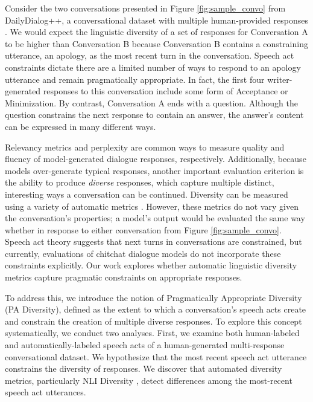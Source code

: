 \documentclass[11pt]{article}
\newcommand{\edivshort}{PA Diversity}
\newcommand{\edivspace}{Pragmatically Appropriate Diversity }
\begin{document}
Consider the two conversations presented in Figure \ref{fig:sample_convo} from DailyDialog++, a conversational dataset with multiple human-provided responses \cite{sai-etal-2020-improving, li-etal-2017-dailydialog}.  We would expect the linguistic diversity of a set of responses for Conversation A to be higher than Conversation B because Conversation B contains a constraining utterance, an apology, as the most recent turn in the conversation. 
Speech act constraints dictate there are a limited number of ways to respond to an apology  utterance and remain pragmatically appropriate.  In fact, the first four writer-generated responses to this conversation include some form of Acceptance or Minimization.  By contrast, Conversation A ends with a question.  Although the question constrains the next response to contain an answer, the answer's content can be expressed in many different ways. 

Relevancy metrics and perplexity are common ways to measure quality and fluency of model-generated dialogue responses, respectively. 
Additionally, because models over-generate typical responses, another important evaluation criterion  is the  ability to produce \textit{diverse} responses, which capture multiple distinct, interesting ways a conversation can be continued.
Diversity  can be
measured using a variety of automatic metrics \cite{li-etal-2016-diversity,nli-placeholder,tevet-berant-2021-evaluating,reimers-gurevych-2020-making, cao-clark-2017-latent, zhu-et-al-acm, larson-etal-2019-outlier}.
However, these metrics do not vary given the conversation's properties; 
a model's output would be evaluated the same way whether in response to either conversation from Figure \ref{fig:sample_convo}. 
Speech act theory suggests that next turns in conversations are constrained, but 
currently, evaluations of chitchat dialogue models do not incorporate these constraints explicitly.  Our work explores whether automatic linguistic diversity metrics capture pragmatic constraints on appropriate responses.



To address this, we introduce the notion of \edivspace (\edivshort), defined as the extent to which a conversation's speech acts create and constrain the creation of multiple diverse responses.  
To explore this concept systematically, we conduct two analyses.  
First, we
examine both human-labeled and automatically-labeled speech acts of a human-generated multi-response conversational dataset. 
We hypothesize that the most recent speech act utterance constrains the diversity of responses.
We discover that automated diversity metrics, particularly NLI Diversity \cite{nli-placeholder}, detect differences among the most-recent speech act utterances.
\end{document}
